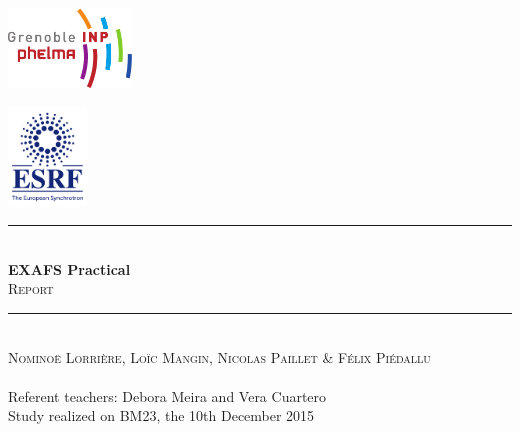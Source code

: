 \begin{titlepage}
    \vspace*{-10px}
    \includegraphics[height=80px]{Images/logo_phelma.pdf}
    \vspace*{-80px}
\begin{flushright}
    \vspace*{-30px}
    \includegraphics[height=100px]{Images/ESRF_logo.jpg}
\end{flushright}

\vspace*{0.5cm}
\begin{center}
\rule{\linewidth}{0.5mm}
    \\[0.4cm]
    {\huge \textbf{EXAFS Practical}}
    \\[0.4cm]
    {\huge \textsc{Report}}
    \\[0.4cm]
\rule{\linewidth}{0.5mm}
\\[1cm]

    \LARGE{\textsc{Nominoë Lorrière, Loïc Mangin, Nicolas Paillet \& Félix Piédallu}}
    \\[0.7cm]
    \large{~}%
    \\[1cm]

    \Large{Referent teachers: Debora Meira and Vera Cuartero}\\[1cm]

    \large{Study realized on BM23, the 10th December 2015}\\[2cm]


\end{center}
\end{titlepage}

\tableofcontents        %
\newpage
{}  %
